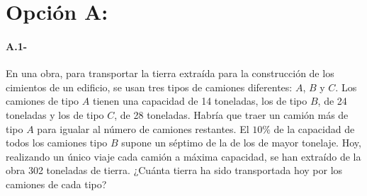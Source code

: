 \section*{Opción A:}
\begin{mybox}
    \paragraph{A.1-}En una obra, para transportar la tierra extraída para la construcción de los cimientos de un edificio, se usan tres
    tipos de camiones diferentes: $A$, $B$ y $C$. Los camiones de tipo $A$ tienen una capacidad de 14 toneladas, los de
    tipo $B$, de 24 toneladas y los de tipo $C$, de 28 toneladas. Habría que traer un camión más de tipo $A$ para igualar
    al número de camiones restantes. El $10\%$ de la capacidad de todos los camiones tipo $B$ supone un séptimo de la
    de los de mayor tonelaje. Hoy, realizando un único viaje cada camión a máxima capacidad, se han extraído de la
    obra 302 toneladas de tierra. ¿Cuánta tierra ha sido transportada hoy por los camiones de cada tipo? 
\end{mybox}


